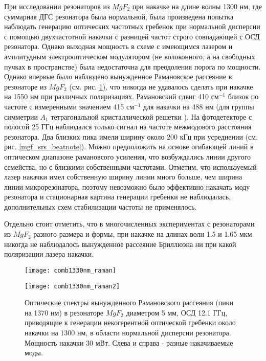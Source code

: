 При исследовании резонаторов из $MgF_2$ при накачке на длине волны 1300 нм, где суммарная ДГС резонатора была нормальной, была произведена попытка наблюдать генерацию оптических частотных гребенок при нормальной дисперсии с помощью двухчастотной накачки с разницей частот строго совпадающей с ОСД резонатора. Однако выходная мощность в схеме с имеющимся лазером и амплитудным электрооптическом модулятором (не волоконного, а на свободных пучках в пространстве) была недостаточна для преодоления порога по мощности. Однако впервые было наблюдено вынужденное Рамановское рассеяние в резонаторе из $MgF_2$ (см. рис. \ref{mgf_srs}), что никогда не удавалось сделать при накачке на 1550 нм при различных поляризациях. Рамановский сдвиг 410 см$^{-1}$ близок по частоте с измеренными значением 415 см$^{-1}$ для накачки на 488 нм (для группы симметрии $A_1$ тетрагональной кристаллической решетки \cite{PhysRev.154.522}). На фотодетекторе с полосой 25 ГГц наблюдался только сигнал на частоте межмодового расстояния резонатора. Два близких пика имели ширину около 200 кГц при усреднении (см. рис. \ref{mgf_srs_beatnote}). Можно предположить на основе огибающей линий в оптическом диапазоне рамановсого усиления, что возбуждались линии другого семейства, но с близкими собственными частотами. Отметим, что используемый лазер накачки имел собственную ширину линии много больше, чем ширина линии микрорезонатора, поэтому невозможно было эффективно накачать моду резонатора и стационарная картина генерации гребенки не наблюдалась, дополнительных схем стабилизации частоты не применялось.

Отдельно стоит отметить, что в многочисленных экспериментах с резонаторами из $MgF_2$ разного размера и формы, при накачке на длинах волн 1.5 и 1.65 мкм никогда не наблюдалось вынужденное рассеяние Бриллюэна ни при какой поляризации лазера накачки.

\begin{figure}[ht]
\begin{minipage}[ht]{0.49\linewidth}\centering
    \texttt{[image: comb1330nm\_raman]}
  \end{minipage}
  \hfill
  \begin{minipage}[ht]{0.49\linewidth}\centering
    \texttt{[image: comb1330nm\_raman2]}
  \end{minipage}
    \caption{Оптические спектры вынужденного Рамановского рассеяния (пики на 1370 нм) в резонаторе $MgF_2$ диаметром 5 мм, ОСД 12.1 ГГц, приводящие к генерации некогерентной оптической гребенки около накачки на 1300 нм, в области нормальной дисперсии резонатора. Мощность накачки 30 мВт. Слева и справа - разные накачиваемые моды.}
  \label{mgf_srs}
\end{figure}

